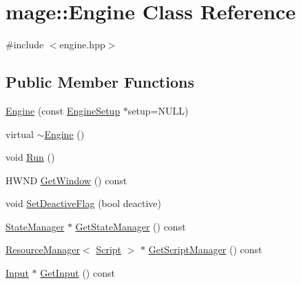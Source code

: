 \hypertarget{classmage_1_1_engine}{}\section{mage\+:\+:Engine Class Reference}
\label{classmage_1_1_engine}


{\ttfamily \#include $<$engine.\+hpp$>$}

\subsection*{Public Member Functions}
\begin{DoxyCompactItemize}
\item 
\hyperlink{classmage_1_1_engine_a5b49f3adf1dd889bb38f5325fd6db317}{Engine} (const \hyperlink{structmage_1_1_engine_setup}{Engine\+Setup} $\ast$setup=N\+U\+LL)
\item 
virtual \hyperlink{classmage_1_1_engine_a34628556f8397d70ed018d71e343c2f5}{$\sim$\+Engine} ()
\item 
void \hyperlink{classmage_1_1_engine_afdc05e214d3f47a6ea3a40dfffd86f80}{Run} ()
\item 
H\+W\+ND \hyperlink{classmage_1_1_engine_a1c5f9d8c68045b36f404251359aa41e4}{Get\+Window} () const
\item 
void \hyperlink{classmage_1_1_engine_a942bfa9892fa79bb1068d7c7ec4e6732}{Set\+Deactive\+Flag} (bool deactive)
\item 
\hyperlink{classmage_1_1_state_manager}{State\+Manager} $\ast$ \hyperlink{classmage_1_1_engine_a4f35bccc3784de531245a2549d537745}{Get\+State\+Manager} () const
\item 
\hyperlink{classmage_1_1_resource_manager}{Resource\+Manager}$<$ \hyperlink{classmage_1_1_script}{Script} $>$ $\ast$ \hyperlink{classmage_1_1_engine_a22e0e2bf1a42a3d4e79d7b768d9bbe15}{Get\+Script\+Manager} () const
\item 
\hyperlink{classmage_1_1_input}{Input} $\ast$ \hyperlink{classmage_1_1_engine_a55d099d040e8895803f15e214f3b6d9e}{Get\+Input} () const
\end{DoxyCompactItemize}
